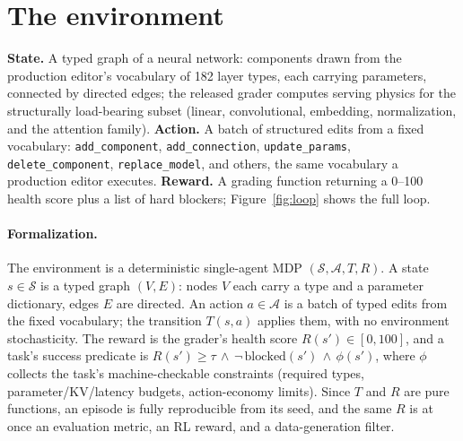 \documentclass[11pt]{article}
\begin{document}
\section{The environment}
\textbf{State.} A typed graph of a neural network: components drawn from the production editor's vocabulary of 182 layer types, each carrying parameters, connected by directed edges; the released grader computes serving physics for the structurally load-bearing subset (linear, convolutional, embedding, normalization, and the attention family). \textbf{Action.} A batch of structured edits from a fixed vocabulary: \texttt{add\_component}, \texttt{add\_connection}, \texttt{update\_params}, \texttt{delete\_component}, \texttt{replace\_model}, and others, the same vocabulary a production editor executes. \textbf{Reward.} A grading function returning a 0--100 health score plus a list of hard blockers; Figure~\ref{fig:loop} shows the full loop.

\paragraph{Formalization.} The environment is a deterministic single-agent MDP $(\mathcal{S},\mathcal{A},T,R)$. A state $s\in\mathcal{S}$ is a typed graph $(V,E)$: nodes $V$ each carry a type and a parameter dictionary, edges $E$ are directed. An action $a\in\mathcal{A}$ is a batch of typed edits from the fixed vocabulary; the transition $T(s,a)$ applies them, with no environment stochasticity. The reward is the grader's health score $R(s')\in[0,100]$, and a task's success predicate is $R(s')\ge\tau \,\wedge\, \neg\,\mathrm{blocked}(s') \,\wedge\, \phi(s')$, where $\phi$ collects the task's machine-checkable constraints (required types, parameter/KV/latency budgets, action-economy limits). Since $T$ and $R$ are pure functions, an episode is fully reproducible from its seed, and the same $R$ is at once an evaluation metric, an RL reward, and a data-generation filter.
\end{document}
